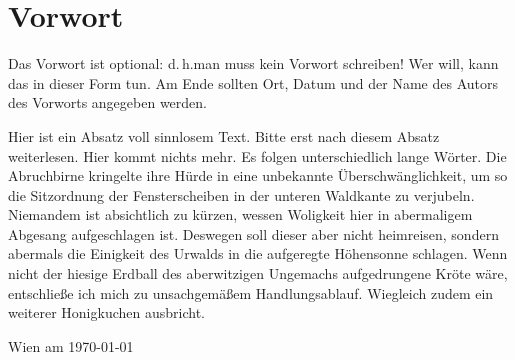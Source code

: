 \chapter*{Vorwort}
Das Vorwort ist optional: d.\,h.\@ man muss kein Vorwort schreiben! Wer will,
kann das in dieser Form tun. Am Ende sollten Ort, Datum und der Name des Autors
des Vorworts angegeben werden. 

Hier ist ein Absatz voll sinnlosem Text. Bitte erst nach
diesem Absatz weiterlesen. Hier kommt nichts mehr. Es folgen unterschiedlich lange Wörter.
Die Abruchbirne kringelte ihre Hürde in eine unbekannte Überschwänglichkeit, um
so die Sitzordnung der Fensterscheiben in der unteren Waldkante zu verjubeln.
Niemandem ist absichtlich zu kürzen, wessen Woligkeit hier in abermaligem
Abgesang aufgeschlagen ist. Deswegen soll dieser aber nicht heimreisen, sondern
abermals die Einigkeit des Urwalds in die aufgeregte Höhensonne schlagen.
Wenn nicht der hiesige Erdball des aberwitzigen Ungemachs aufgedrungene
Kröte wäre, entschließe ich mich zu unsachgemäßem Handlungsablauf.
Wiegleich zudem ein weiterer Honigkuchen ausbricht.

\begin{flushleft}
Wien am \today
\end{flushleft}
\begin{flushright}
\makeatletter\@AutorIn\makeatother
\end{flushright}
